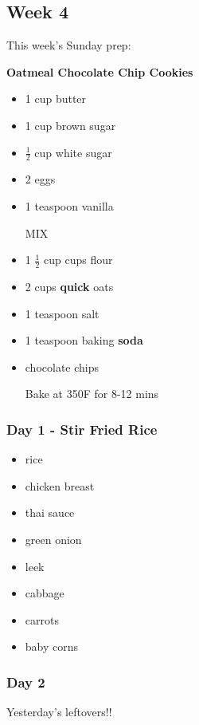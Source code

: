\documentclass[11pt, a4paper]{article}
\begin{document}
\vspace{0.917 pc} %


\pagebreak
\subsection{Week 4}

This week's Sunday prep:
\par
\vspace{1pc}
\noindent\textbf{Oatmeal Chocolate Chip Cookies}
\par

\begin{itemize}
\item 1 cup butter
\item 1 cup brown sugar
\item $\frac{1}{2}$ cup white sugar
\item 2 eggs
\item 1 teaspoon vanilla
\par
MIX
\item 1 $\frac{1}{2}$ cup cups flour
\item 2 cups \textbf{quick} oats
\item 1 teaspoon salt
\item 1 teaspoon baking \textbf{soda}
\item chocolate chips
\par
Bake at 350F for 8-12 mins
\end{itemize}

\subsubsection{Day 1 - Stir Fried Rice}
\vspace{1pc}
\begin{itemize}
\item rice
\item chicken breast
\item thai sauce
\item green onion
\item leek
\item cabbage
\item carrots
\item baby corns
\end{itemize}

\subsubsection{Day 2}
\vspace{1pc}
Yesterday's leftovers!!
\end{document}
